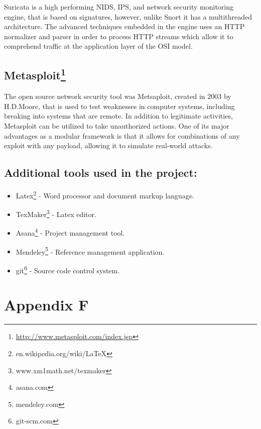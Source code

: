 \documentclass[11pt,]{article}
\begin{document}
Suricata is a high performing NIDS, IPS, and network security monitoring
engine, that is based on signatures, however, unlike Snort it has a
multithreaded architecture. The advanced techniques embedded in the
engine uses an HTTP normalizer and parser in order to process HTTP
streams which allow it to comprehend traffic at the application layer of
the OSI model.

\subsection*{Metasploit\footnote{\url{http://www.metasploit.com/index.jsp}}}\label{metasploit12}

The open source network security tool was Metsaploit, created in 2003 by
H.D.Moore, that is used to test weaknesses in computer systems,
including breaking into systems that are remote. In addition to
legitimate activities, Metasploit can be utilized to take unauthorized
actions. One of its major advantages as a modular framework is that it
allows for combinations of any exploit with any payload, allowing it to
simulate real-world attacks.

\subsection{Additional tools used in the
project:}\label{additional-tools-used-in-the-project}

\begin{itemize}
\itemsep1pt\parskip0pt
\item
  Latex\footnote{en.wikipedia.org/wiki/LaTeX} - Word processor and
  document markup language.
\item
  TexMaker\footnote{www.xm1math.net/texmaker} - Latex editor.
\item
  Asana\footnote{asana.com} - Project management tool.
\item
  Mendeley\footnote{mendeley.com} - Reference management application.
\item
  git\footnote{git-scm.com} - Source code control system.
\end{itemize}

\newpage

\section*{Appendix F}\label{appendix-f}
\end{document}
